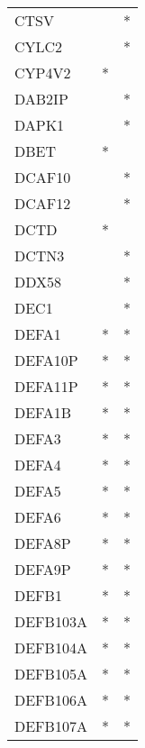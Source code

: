 \begin{longtable}{lcc}
CTSV                  &                &          * \\
CYLC2                 &                &          * \\
CYP4V2                &              * &            \\
DAB2IP                &                &          * \\
DAPK1                 &                &          * \\
DBET                  &              * &            \\
DCAF10                &                &          * \\
DCAF12                &                &          * \\
DCTD                  &              * &            \\
DCTN3                 &                &          * \\
DDX58                 &                &          * \\
DEC1                  &                &          * \\
DEFA1                 &              * &          * \\
DEFA10P               &              * &          * \\
DEFA11P               &              * &          * \\
DEFA1B                &              * &          * \\
DEFA3                 &              * &          * \\
DEFA4                 &              * &          * \\
DEFA5                 &              * &          * \\
DEFA6                 &              * &          * \\
DEFA8P                &              * &          * \\
DEFA9P                &              * &          * \\
DEFB1                 &              * &          * \\
DEFB103A              &              * &          * \\
DEFB104A              &              * &          * \\
DEFB105A              &              * &          * \\
DEFB106A              &              * &          * \\
DEFB107A              &              * &          * \\

\end{longtable}
